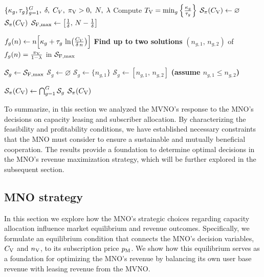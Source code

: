 \documentclass[12pt, draftclsnofoot, onecolumn]{IEEEtran}
\begin{document}
		\begin{algorithm}[htbp]
			\small
			\setlength{\belowcaptionskip}{-15pt}
			\caption{Profitability set for proposed capacity $C_{\rm V}$}
			\label{alg_profitab}
			\begin{algorithmic}[1]
				\Require $\{\kappa_g,\tau_g\}_{g=1}^G,\;\delta,\;C_V,\;\pi_{\rm V}>0,\;N,\;\lambda$
				\State Compute $T_{\rm V} = \min_{g}\left\{\frac{\kappa_g}{\tau_g}\right\}$
				\State $\mathcal{S}_{\pi}(C_{\rm V}) \gets \varnothing$
				\State \Return $\mathcal{S}_{\pi}(C_{\rm V})$
				\EndIf
				\State $\mathcal{S}_{\rm F,max} \gets \bigl[\tfrac{1}{\delta},\,N-\tfrac{1}{\delta}\bigr]$
				
				\State $f_g(n) \gets n\Bigl[\kappa_g + \tau_g\,\ln\bigl(\tfrac{C_V}{\delta\,n}\bigr)\Bigr]$
				\State \textbf{Find up to two solutions} $(n_{g,1},\,n_{g,2})$ of $f_g(n)=\frac{\pi_{\rm V}}{1-\lambda}$ in $\mathcal{S}_{\rm F,max}$
				
				
				\State $\mathcal{S}_g \gets \mathcal{S}_{\rm F,max}$
				\Else
				\State $\mathcal{S}_g \gets \varnothing$
				\EndIf
				\State $\mathcal{S}_g \gets \{n_{g,1}\}$
				\Else
				\State $\mathcal{S}_g \gets [n_{g,1},\,n_{g,2}]$ \quad\textbf{(assume $n_{g,1}\le n_{g,2}$)}
				\EndIf
				\EndFor
				
				\State $\mathcal{S}_{\pi}(C_{\rm V}) \gets \bigcap_{g=1}^G \mathcal{S}_g$
				\State \Return $\mathcal{S}_{\pi}(C_{\rm V})$
			\end{algorithmic}
		\end{algorithm}

		
		
		
		To summarize, in this section we analyzed the MVNO’s response to the MNO’s decisions on capacity leasing and subscriber allocation. By characterizing the feasibility and profitability conditions, we have established necessary constraints that the MNO must consider to ensure a sustainable and mutually beneficial cooperation. The results provide a foundation to determine optimal decisions in the MNO’s revenue maximization strategy, which will be further explored in the subsequent section.
		\subsection{MNO strategy}
		In this section we explore how the MNO's strategic choices regarding capacity allocation influence market equilibrium and revenue outcomes. Specifically, we formulate an equilibrium condition that connects the MNO's decision variables, $C_{\rm V}$ and $n_{\rm V}$, to its subscription price \(p_{\rm M}\). We show how this equilibrium serves as a foundation for optimizing the MNO’s revenue by balancing its own user base revenue with leasing revenue from the MVNO.	
		
\end{document}
